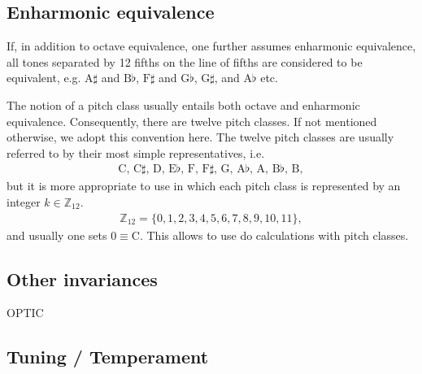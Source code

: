 \documentclass[letterpaper,10pt,english]{sphinxmanual}
\begin{document}
\subsection{Enharmonic equivalence}
\label{\detokenize{1_fundamentals:enharmonic-equivalence}}
\sphinxAtStartPar
If, in addition to octave equivalence, one further assumes enharmonic equivalence,
all tones separated by 12 fifths on the line of fifths
are considered to be equivalent, e.g. \(\text{A}\sharp\) and \(\text{B}\flat\),
\(\text{F}\sharp\) and \(\text{G}\flat\), \(\text{G}\sharp\), and \(\text{A}\flat\) etc.

\sphinxAtStartPar
The notion of a pitch class usually entails both octave and enharmonic equivalence.
Consequently, there are twelve pitch classes. If not mentioned otherwise, we adopt this convention here.
The twelve pitch classes are usually referred to by their most simple representatives, i.e.
\begin{equation*}
\begin{split}\text{C, C$\sharp$, D, E$\flat$, F, F$\sharp$, G, A$\flat$, A, B$\flat$, B},\end{split}
\end{equation*}
\sphinxAtStartPar
but it is more appropriate to use  in which each pitch class is represented
by an integer \(k \in \mathbb{Z}_{12}\).
\begin{equation*}
\begin{split}\mathbb{Z}_{12}=\{0, 1, 2, 3, 4, 5, 6, 7, 8, 9, 10, 11\},\end{split}
\end{equation*}
\sphinxAtStartPar
and usually one sets \(0\equiv \text{C}\). This allows to use 
do calculations with pitch classes.


\subsection{Other invariances}
\label{\detokenize{1_fundamentals:other-invariances}}
\sphinxAtStartPar
OPTIC


\subsection{Tuning / Temperament}
\label{\detokenize{1_fundamentals:tuning-temperament}}
\end{document}
